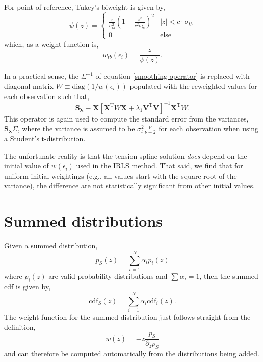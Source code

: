 \documentclass[10pt,journal]{IEEEtran}
\begin{document}
For point of reference, Tukey's biweight is given by,
\begin{equation}
\psi(z) = 
\begin{cases}
\frac{z}{\sigma_{tb}^2} \left(1-\frac{z^2}{c^2 \sigma_{tb}^2} \right)^2 & |z| < c \cdot \sigma_{tb} \\
0 & \textrm{else}
\end{cases}
\end{equation}
which, as a weight function is,
\begin{equation}
    w_{tb}(\epsilon_i) = \frac{z}{\psi(z)}.
\end{equation}

In a practical sense, the $\Sigma^{-1}$ of equation \ref{smoothing-operator} is replaced with diagonal matrix $W\equiv\textrm{diag}(1/w(\epsilon_i))$ populated with the reweighted values for each observation such that,
\begin{equation}
\label{general-smoothing-operator}
\mathbf{S_\lambda} \equiv \mathbf{X} \left[ \mathbf{X}^{\textrm{T}} W \mathbf{X} + \lambda_1 \mathbf{V}^{\textrm{T}} \mathbf{V} \right]^{-1} \mathbf{X}^{\textrm{T}} W.
\end{equation}
This operator is again used to compute the standard error from the variances,  $\mathbf{S_\lambda} \Sigma$, where the variance is assumed to be $\sigma_t^2 \frac{\nu}{\nu-2}$ for each observation when using a Student's t-distribution.

The unfortunate reality is that the tension spline solution \emph{does} depend on the initial value of $w(\epsilon_i)$ used in the IRLS method. That said, we find that for uniform initial weightings (e.g., all values start with the square root of the variance), the difference are not statistically significant from other initial values.

\section{Summed distributions}
\label{sec:summed_distributions}

Given a summed distribution,
\begin{equation}
    p_S(z) = \sum_{i=1}^N \alpha_i p_i(z)
\end{equation}
where $p_i(z)$ are valid probability distributions and $\sum \alpha_i = 1$, then the summed cdf is given by,
\begin{equation}
    \textrm{cdf}_S(z) = \sum_{i=1}^N \alpha_i \textrm{cdf}_i(z).
\end{equation}
The weight function for the summed distribution just follows straight from the definition,
\begin{equation}
    w(z) = - z\frac{p_S}{\partial_z p_S}
\end{equation}
and can therefore be computed automatically from the distributions being added.
\end{document}
